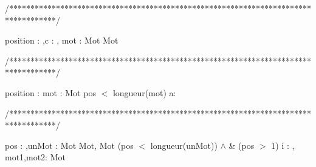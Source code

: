 /***********************************************************************************/
\begin{algorithme}%
       {position : \entier,c : \caractere, mot : Mot}%
       {Mot}%
       {}
       {
       
       }
\end{algorithme}

/***********************************************************************************/
\begin{algorithme}%
      {position : \entier}%
      {mot : Mot}%
      {pos $<$ longueur(mot)}%
      {a: \caractere }%
      {
         
      }
\end{algorithme}

/***********************************************************************************/
\begin{algorithme}
         {pos : \entier,unMot : Mot}%
         {Mot, Mot}%
         {(pos $<$ longueur(unMot)) $\land$ \& (pos $>$ 1)}%
         {i : \entier, mot1,mot2: Mot}%
         {
                {
                }
                {
                }
          }
\end{algorithme}
